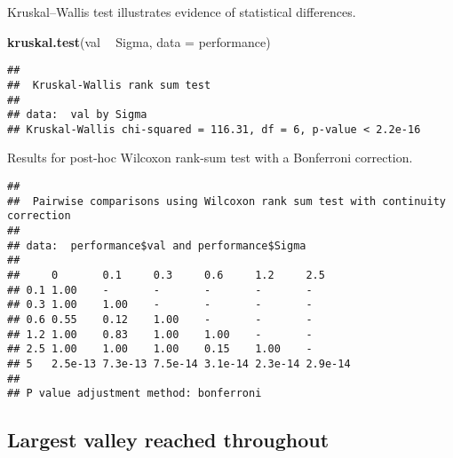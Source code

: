 \documentclass[]{book}
\newenvironment{Shaded}{\begin{snugshade}}{\end{snugshade}}
\newcommand{\DataTypeTok}[1]{\textcolor[rgb]{0.13,0.29,0.53}{#1}}
\newcommand{\KeywordTok}[1]{\textcolor[rgb]{0.13,0.29,0.53}{\textbf{#1}}}
\newcommand{\NormalTok}[1]{#1}
\newcommand{\OperatorTok}[1]{\textcolor[rgb]{0.81,0.36,0.00}{\textbf{#1}}}
\newcommand{\OtherTok}[1]{\textcolor[rgb]{0.56,0.35,0.01}{#1}}
\newcommand{\StringTok}[1]{\textcolor[rgb]{0.31,0.60,0.02}{#1}}
\begin{document}
Kruskal--Wallis test illustrates evidence of statistical differences.

\begin{Shaded}
\begin{Highlighting}[]
\KeywordTok{kruskal.test}\NormalTok{(val }\OperatorTok{~}\StringTok{ }\NormalTok{Sigma, }\DataTypeTok{data =}\NormalTok{ performance)}
\end{Highlighting}
\end{Shaded}

\begin{verbatim}
## 
##  Kruskal-Wallis rank sum test
## 
## data:  val by Sigma
## Kruskal-Wallis chi-squared = 116.31, df = 6, p-value < 2.2e-16
\end{verbatim}

Results for post-hoc Wilcoxon rank-sum test with a Bonferroni correction.

\begin{Shaded}
\end{Shaded}

\begin{verbatim}
## 
##  Pairwise comparisons using Wilcoxon rank sum test with continuity correction 
## 
## data:  performance$val and performance$Sigma 
## 
##     0       0.1     0.3     0.6     1.2     2.5    
## 0.1 1.00    -       -       -       -       -      
## 0.3 1.00    1.00    -       -       -       -      
## 0.6 0.55    0.12    1.00    -       -       -      
## 1.2 1.00    0.83    1.00    1.00    -       -      
## 2.5 1.00    1.00    1.00    0.15    1.00    -      
## 5   2.5e-13 7.3e-13 7.5e-14 3.1e-14 2.3e-14 2.9e-14
## 
## P value adjustment method: bonferroni
\end{verbatim}

\hypertarget{largest-valley-reached-throughout-16}{%
\subsection{Largest valley reached throughout}\label{largest-valley-reached-throughout-16}}
\end{document}

